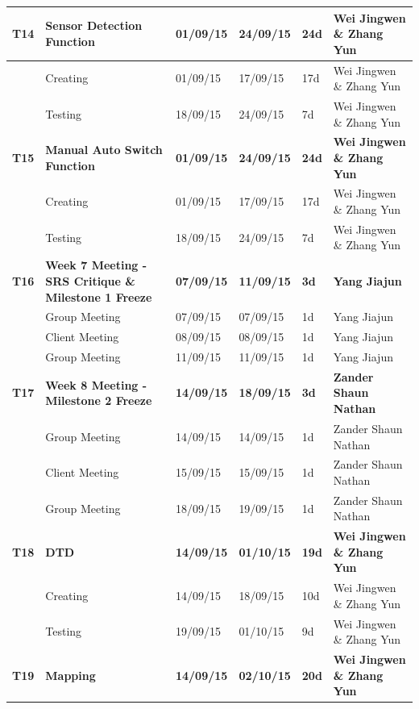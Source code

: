 \documentclass[11pt, a4paper]{article}
\begin{document}
\newpage
\begin{tabular} 
	  {|p{1.2cm}|p{5cm}|p{1.4cm}|p{1.4cm}|p{1.2cm}|p{4cm}|}
\hline
\textbf{T14} &\textbf{Sensor Detection Function} & \textbf{01/09/15}&\textbf{24/09/15}&\textbf{24d}&\textbf{Wei Jingwen \& Zhang Yun}\\
\hline
{} &{Creating} &  {01/09/15}&{17/09/15}&{17d}&{Wei Jingwen \& Zhang Yun}\\
\hline
{} &{Testing} &  {18/09/15}&{24/09/15}&{7d}&{Wei Jingwen \& Zhang Yun} \\
\hline 
\textbf{T15} &\textbf{Manual Auto Switch Function} & \textbf{01/09/15}&\textbf{24/09/15}&\textbf{24d}&\textbf{Wei Jingwen \& Zhang Yun}\\
\hline
{} &{Creating} &  {01/09/15}&{17/09/15}&{17d}&{Wei Jingwen \& Zhang Yun}\\
\hline
{} &{Testing} & {18/09/15}&{24/09/15}&{7d}&{Wei Jingwen \& Zhang Yun} \\
\hline 
\textbf{T16} &\textbf{Week 7 Meeting - SRS Critique \& Milestone 1 Freeze} & \textbf{07/09/15}&\textbf{11/09/15}&\textbf{3d}&\textbf{Yang Jiajun} \\
\hline 
{} &{Group Meeting} &  {07/09/15}&{07/09/15}&{1d}&{Yang Jiajun} \\
\hline 
{} &{Client Meeting} &  {08/09/15}&{08/09/15}&{1d}&{Yang Jiajun} \\
\hline 
{} &{Group Meeting} &  {11/09/15}&{11/09/15}&{1d}&{Yang Jiajun} \\
\hline 
\textbf{T17} &\textbf{Week 8 Meeting - Milestone 2 Freeze} & \textbf{14/09/15}&\textbf{18/09/15}&\textbf{3d}&\textbf{Zander Shaun Nathan} \\
\hline 
{} &{Group Meeting} &  {14/09/15}&{14/09/15}&{1d}&{Zander Shaun Nathan} \\
\hline 
{} &{Client Meeting} &  {15/09/15}&{15/09/15}&{1d}&{Zander Shaun Nathan} \\
\hline 
{} &{Group Meeting} &  {18/09/15}&{19/09/15}&{1d}&{Zander Shaun Nathan} \\
\hline 
\textbf{T18} &\textbf{DTD} & \textbf{14/09/15}&\textbf{01/10/15}&\textbf{19d}&\textbf{Wei Jingwen \& Zhang Yun}\\
\hline
{} &{Creating} &  {14/09/15}&{18/09/15}&{10d}&{Wei Jingwen \& Zhang Yun}\\
\hline
{} &{Testing} &  {19/09/15}&{01/10/15}&{9d}&{Wei Jingwen \& Zhang Yun} \\
\hline 
\textbf{T19} &\textbf{Mapping} & \textbf{14/09/15}&\textbf{02/10/15}&\textbf{20d}&\textbf{Wei Jingwen \& Zhang Yun}\\

\end{tabular}
\end{document}
